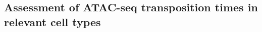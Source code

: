 %



\subsection{Assessment of ATAC-seq transposition times in relevant cell types}
\label{ATACseq}

